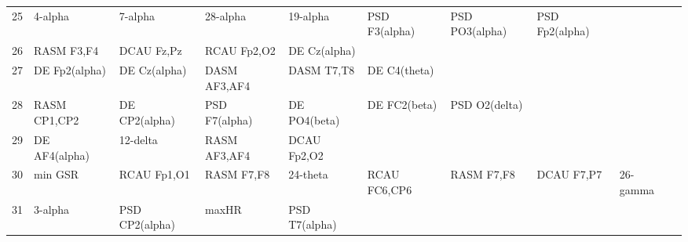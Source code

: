 \begin{landscape}
\begin{table}[]
\begin{tabular}{l|llllllll}
25       & 4-alpha               & 7-alpha               & 28-alpha             & 19-alpha                & PSD F3(alpha)           & PSD PO3(alpha)       & PSD Fp2(alpha)       &                       &                       &                    \\
26       & RASM F3,F4            & DCAU Fz,Pz            & RCAU Fp2,O2          & DE Cz(alpha)            &                         &                      &                      &                       &                       &                    \\
27       & DE Fp2(alpha)         & DE Cz(alpha)          & DASM AF3,AF4         & DASM T7,T8              & DE C4(theta)            &                      &                      &                       &                       &                    \\
28       & RASM CP1,CP2          & DE CP2(alpha)         & PSD F7(alpha)        & DE PO4(beta)            & DE FC2(beta)            & PSD O2(delta)        &                      &                       &                       &                    \\
29       & DE AF4(alpha)         & 12-delta              & RASM AF3,AF4         & DCAU Fp2,O2             &                         &                      &                      &                       &                       &                    \\
30       & min GSR               & RCAU Fp1,O1           & RASM F7,F8           & 24-theta                & RCAU FC6,CP6            & RASM F7,F8           & DCAU F7,P7           & 26-gamma              &                       &                    \\
31       & 3-alpha               & PSD CP2(alpha)        & maxHR                & PSD T7(alpha)           &                         &                      &                      &                       &                       &                    \\
\end{tabular}
\end{table}
\end{landscape}
\clearpage
